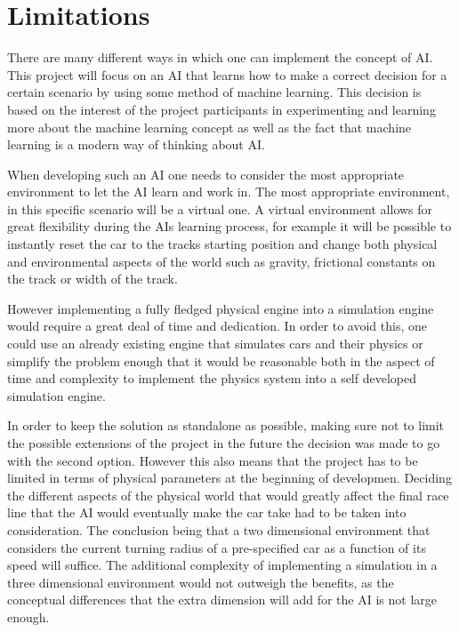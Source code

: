 \section{Limitations} %
There are many different ways in which one can implement the concept of AI. This project will focus on an AI that learns how to make a correct decision for a certain scenario by using some method of machine learning. This decision is based on the interest of the project participants in experimenting and learning more about the machine learning concept as well as the fact that machine learning is a modern way of thinking about AI.

When developing such an AI one needs to consider the most appropriate environment to let the AI learn and work in. The most appropriate environment, in this specific scenario will be a virtual one. A virtual environment allows for great flexibility during the AIs learning process, for example it will be possible to instantly reset the car to the tracks starting position and change both physical and environmental aspects of the world such as gravity, frictional constants on the track or width of the track.

However implementing a fully fledged physical engine into a simulation engine would require a great deal of time and dedication. In order to avoid this, one could use an already existing engine that simulates cars and their physics or simplify the problem enough that it would be reasonable both in the aspect of time and complexity to implement the physics system into a self developed simulation engine.

In order to keep the solution as standalone as possible, making sure not to limit the possible extensions of the project in the future the decision was made to go with the second option. However this also means that the project has to be limited in terms of physical parameters at the beginning of developmen. Deciding the different aspects of the physical world that would greatly affect the final race line that the AI would eventually make the car take had to be taken into consideration. The conclusion being that a two dimensional environment that considers the current turning radius of a pre-specified car as a function of its speed will suffice. The additional complexity of implementing a simulation in a three dimensional environment would not outweigh the benefits, as the conceptual differences that the extra dimension will add for the AI is not large enough.


